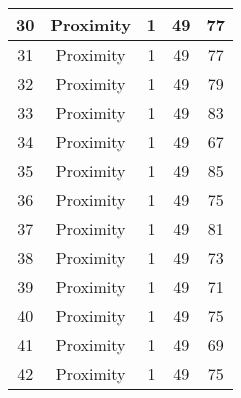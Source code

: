 \documentclass[results.tex]{subfiles}
\begin{document}
\begin{center}
\begin{tabular}{| c || c | c | c | c |}
            \hline
            30                      & Proximity                    & 1                      & 49                      & 77                   \\
            \hline
            31                      & Proximity                    & 1                      & 49                      & 77                   \\
            \hline
            32                      & Proximity                    & 1                      & 49                      & 79                   \\
            \hline
            33                      & Proximity                    & 1                      & 49                      & 83                   \\
            \hline
            34                      & Proximity                    & 1                      & 49                      & 67                   \\
            \hline
            35                      & Proximity                    & 1                      & 49                      & 85                   \\
            \hline
            36                      & Proximity                    & 1                      & 49                      & 75                   \\
            \hline
            37                      & Proximity                    & 1                      & 49                      & 81                   \\
            \hline
            38                      & Proximity                    & 1                      & 49                      & 73                   \\
            \hline
            39                      & Proximity                    & 1                      & 49                      & 71                   \\
            \hline
            40                      & Proximity                    & 1                      & 49                      & 75                   \\
            \hline
            41                      & Proximity                    & 1                      & 49                      & 69                   \\
            \hline
            42                      & Proximity                    & 1                      & 49                      & 75                   \\

\end{tabular}
\end{center}
\end{document}

